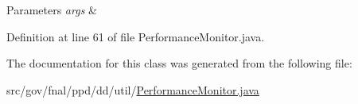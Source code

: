 \begin{DoxyParams}{Parameters}
{\em args} & \\
\hline
\end{DoxyParams}


Definition at line 61 of file Performance\-Monitor.\-java.



The documentation for this class was generated from the following file\-:\begin{DoxyCompactItemize}
\item 
src/gov/fnal/ppd/dd/util/\hyperlink{PerformanceMonitor_8java}{Performance\-Monitor.\-java}\end{DoxyCompactItemize}
